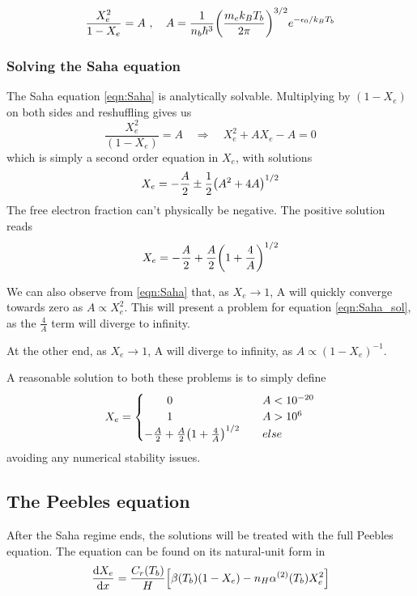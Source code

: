 \documentclass[10pt, a4paper]{article}
\begin{document}
\begin{equation}\label{eqn:Saha}
    \frac{X_{e}^{2}}{1-X_{e}} = A\ , \quad A = \frac{1}{n_{b}\hbar^3}\qty(\frac{m_{e} k_B T_{b}}{2 \pi})^{3 / 2} e^{-\epsilon_{0} / k_B T_{b}}
\end{equation}

\subsubsection{Solving the Saha equation}
The Saha equation \ref{eqn:Saha} is analytically solvable. Multiplying by $(1-X_e)$ on both sides and reshuffling gives us
\begin{equation*}
    \frac{X_e^2}{(1-X_e)} = A \quad \Rightarrow \quad X_e^2 + AX_e - A = 0
\end{equation*}
which is simply a second order equation in $X_e$, with solutions
\begin{equation*}
    X_e = - \frac{A}{2} \pm \frac{1}{2}\qty(A^2 + 4A)^{1/2}
\end{equation*}
The free electron fraction can't physically be negative. The positive solution reads
\begin{equation}\label{eqn:Saha_sol}
    X_e = - \frac{A}{2} + \frac{A}{2}\qty(1 + \frac{4}{A})^{1/2}
\end{equation}

We can also observe from \ref{eqn:Saha} that, as $X_e \rightarrow 1$, A will quickly converge towards zero as $A \propto X_e^2$. This will present a problem for equation \ref{eqn:Saha_sol}, as the $\frac{4}{A}$ term will diverge to infinity.

At the other end, as $X_e \rightarrow 1$, A will diverge to infinity, as $A \propto (1 - X_e)^{-1}$.

A reasonable solution \cite{Grandma} to both these problems is to simply define
\begin{equation}\label{eqn:Saha_sol2}
    X_e =
    \begin{cases}
        \quad\quad 0& \quad A < 10^{-20} \\
        \quad\quad 1& \quad A > 10^6 \\
        - \frac{A}{2} + \frac{A}{2}\qty(1 + \frac{4}{A})^{1/2}& \quad else
     \end{cases}    
\end{equation}
avoiding any numerical stability issues.


\subsection{The Peebles equation}\label{sec:Peebles}
After the Saha regime ends, the solutions will be treated with the full Peebles equation. The equation can be found on its natural-unit form in \cite{ModernCosmology2003}
\begin{equation}
    \label{eqn:Peebles}
    \dv{X_{e}}{x}=\frac{C_{r}\qty(T_{b})}{H}\qty[\beta\qty(T_{b})\qty(1-X_{e})-n_{H} \alpha^{(2)}\qty(T_{b}) X_{e}^{2}]
\end{equation}
\end{document}

